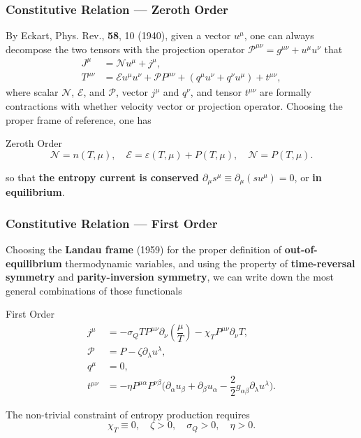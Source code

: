 \documentclass[10pt,aspectratio=43,xcolor=x11names,t]{beamer}%
\begin{document}
		\begin{frame}\frametitle{Constitutive Relation --- Zeroth Order}
			By {\scriptsize Eckart, Phys. Rev., \textbf{58}, 10 (1940)}, given a vector $u^\mu$, one can always decompose the two tensors with the projection operator $\mathcal{P}^{\mu\nu}=g^{\mu\nu}+u^\mu u^\nu$ that
			\begin{align*}
				J^\mu&=\mathcal{N}u^\mu+j^\mu,\\
				T^{\mu\nu}&=\mathcal{E}u^\mu u^\nu+\mathcal{P}P^{\mu\nu}+(q^\mu u^\nu+q^\nu u^\mu)+t^{\mu\nu},
			\end{align*}
			where scalar $\mathcal{N}$, $\mathcal{E}$, and $\mathcal{P}$, vector $j^\mu$ and $q^\nu$, and tensor $t^{\mu\nu}$ are formally contractions with whether velocity vector or projection operator.
			\pause
			Choosing the proper frame of reference, one has
			\begin{block}{Zeroth Order}
				\begin{equation*}
					\mathcal{N}=n(T,\mu),\quad \mathcal{E}=\varepsilon(T,\mu)+P(T,\mu),\quad\mathcal{N}=P(T,\mu).
				\end{equation*}
			\end{block}
			so that \textbf{\color{red}the entropy current is conserved $\partial_\mu s^\mu\equiv \partial_\mu (su^\mu)=0$}, or \textbf{in equilibrium}.
		\end{frame}
		

		\begin{frame}\frametitle{Constitutive Relation --- First Order}
			Choosing the \textbf{Landau frame} (1959) for the proper definition of \textbf{\color{red}out-of-equilibrium} thermodynamic variables, and using the property of \textbf{time-reversal symmetry} and \textbf{parity-inversion symmetry}, we can write down the most general combinations of those functionals
			\begin{block}{First Order}
				\begin{align*}
					j^\mu&=-\sigma_Q TP^{\mu\nu}\partial_\nu\left(\dfrac{\mu}{T}\right)-\chi_T P^{\mu\nu}\partial_\nu T,\\
					\mathcal{P}&=P-\zeta \partial_\lambda u^\lambda,\\
					q^\mu&=0,\\
					t^{\mu\nu}&=-\eta P^{\mu\alpha}P^{\nu\beta}\bigg(\partial_\alpha u_\beta+\partial_\beta u_\alpha-\dfrac{2}{2}g_{\alpha\beta}\partial_\lambda u^\lambda\bigg).
				\end{align*}
			\end{block}
			\pause
			The non-trivial constraint of entropy production requires
			\begin{equation*}
				\chi_T\equiv0,\quad \zeta>0,\quad \sigma_Q>0,\quad\eta>0. 
			\end{equation*}
		\end{frame}
\end{document}
